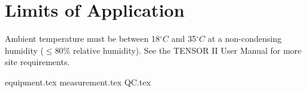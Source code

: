 \documentclass[12pt]{article}
\newcommand*{\sectiondir}{sections/}
\begin{document}
\section{Limits of Application}
Ambient temperature must be between 18$^\circ C$ and 35$^\circ C$ at a non-condensing humidity ($\le 80\%$ relative humidity). See the TENSOR II User Manual\cite{Bruker1} for more site requirements. 

{equipment.tex}
{measurement.tex}
{QC.tex}

\printbibliography
\label{lastpage} %
\end{document}

